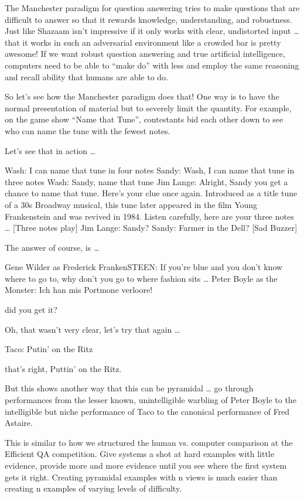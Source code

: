 The Manchester paradigm for question answering tries to make questions that are difficult to answer so that it rewards knowledge, understanding, and robustness.  Just like Shazaam isn’t impressive if it only works with clear, undistorted input … that it works in such an adversarial environment like a crowded bar is pretty awesome!  If we want robust question answering and true artificial intelligence, computers need to be able to “make do” with less and employ the same reasoning and recall ability that humans are able to do.

So let’s see how the Manchester paradigm does that!  One way is to have the normal presentation of material but to severely limit the quantity.  For example, on the game show “Name that Tune”, contestants bid each other down to see who can name the tune with the fewest notes.

Let’s see that in action … 

Wash: I can name that tune in four notes
Sandy: Wash, I can name that tune in three notes
Wash: Sandy, name that tune
Jim Lange: Alright, Sandy you get a chance to name that tune.  Here’s your clue once again.  Introduced as a title tune of a 30s Broadway musical, this tune later appeared in the film Young Frankenstein and was revived in 1984.  Listen carefully, here are your three notes …
[Three notes play]
Jim Lange: Sandy?
Sandy: Farmer in the Dell?
[Sad Buzzer]

The answer of course, is … 

Gene Wilder as Frederick FrankenSTEEN: If you’re blue and you don’t know where to go to, why don’t you go to where fashion sits …
Peter Boyle as the Monster: Ich han mis Portmone verloore!


did you get it?

Oh, that wasn’t very clear, let’s try that again … 

Taco: Putin’ on the Ritz

that’s right, Puttin’ on the Ritz.

But this shows another way that this can be pyramidal … go through performances from the lesser known, unintelligible warbling of Peter Boyle to the intelligible but niche performance of Taco to the canonical performance of Fred Astaire.  

This is similar to how we structured the human vs. computer comparison at the Efficient QA competition.  Give systems a shot at hard examples with little evidence, provide more and more evidence until you see where the first system gets it right.  Creating pyramidal examples with n views is much easier than creating n examples of varying levels of difficulty.

